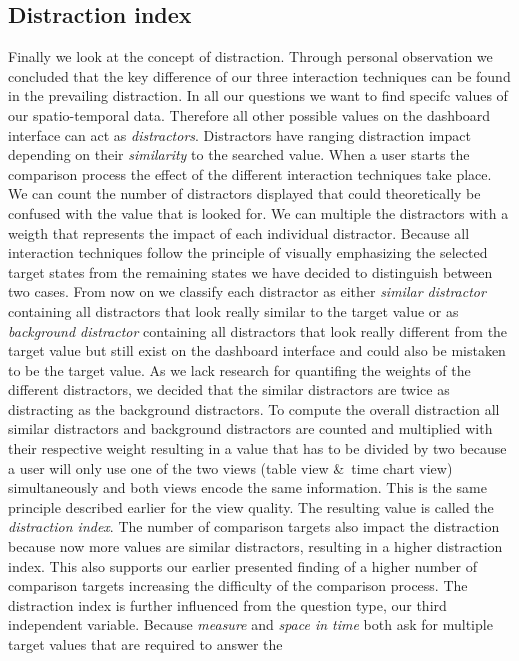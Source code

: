 \subsection{Distraction index}
Finally we look at the concept of distraction. Through personal observation we concluded that the key difference of our three interaction
techniques can be found in the prevailing distraction. In all our questions we want to find specifc values of our spatio-temporal data. Therefore
all other possible values on the dashboard interface can act as \textit{distractors}. Distractors have ranging distraction impact depending on
their \textit{similarity} to the searched value. When a user starts the comparison process the effect of the different interaction techniques
take place. We can count the number of distractors displayed that could theoretically be confused with the value that is looked for. We can
multiple the distractors with a weigth that represents the impact of each individual distractor. Because all interaction techniques follow the principle
of visually emphasizing the selected target states from the remaining states we have decided to distinguish between two cases. From now on we classify
each distractor as either \textit{similar distractor} containing all distractors that look really similar to the target value or as
\textit{background distractor} containing all distractors that look really different from the target value but still exist on the dashboard
interface and could also be mistaken to be the target value. As we lack research for quantifing the weights of the different distractors, we
decided that the similar distractors are twice as distracting as the background distractors. To compute the overall distraction all similar distractors
and background distractors are counted and multiplied with their respective weight resulting in a value that has to be divided by two because a user
will only use one of the two views (table view \&\ time chart view) simultaneously and both views encode the same information. This is the same principle
described earlier for the view quality. The resulting value is called the \textit{distraction index}. The number of comparison targets also impact
the distraction because now more values are similar distractors, resulting in a higher distraction index. This also supports our earlier presented finding
of a higher number of comparison targets increasing the difficulty of the comparison process. The distraction index is further influenced from the question
type, our third independent variable. Because \textit{measure} and \textit{space in time} both ask for multiple target values that are required to answer the
